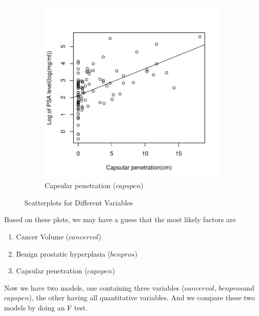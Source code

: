\documentclass[12pt,letterpaper,titlepage,en-US]{article}
\begin{document}
\begin{figure}[H]
\begin{subfigure}[t]{0.5\textwidth}
    \end{subfigure}
    \\
    \begin{subfigure}[t]{0.5\textwidth}
        \centering
        \caption{Capsular penetration ($capspen$)}
        \includegraphics[width=.96\textwidth]{fig/boxplotcapspen.pdf}
    \end{subfigure}%
    \caption{Scatterplots for Different Variables}\label{b1}
\end{figure}


Based on these plots, we may have a guess that the most likely factors are 
\begin{enumerate}
\item Cancer Volume ($cancervol$)
\item Benign prostatic hyperplasia ($benpros$) 
\item Capsular penetration ($capspen$)
\end{enumerate}

Now we have two models, one containing three variables ($cancervol$, $benpros$and $capspen$), the other having all quantitative variables. And we compare these two models by doing an F test.
\end{document}
